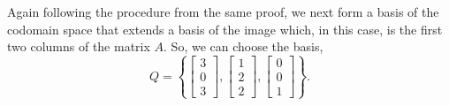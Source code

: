 \documentclass[../MathsNotesBase.tex]{subfiles}
\begin{document}
{\begin{exe}
{			Again following the procedure from the same proof, we next form a basis of the codomain space that extends a basis of the image which, in this case, is the first two columns of the matrix $A$. So, we can choose the basis,
			\[ Q = \left\{ \begin{bmatrix}3\\0\\3\end{bmatrix}, \begin{bmatrix}1\\2\\2\end{bmatrix}, \begin{bmatrix}0\\0\\1\end{bmatrix} \right\}. \]
			
}
\end{exe}}
\end{document}
